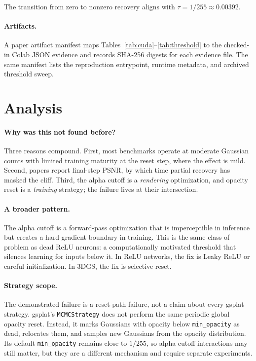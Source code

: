 \documentclass[runningheads]{llncs}
\begin{document}
The transition from zero to nonzero recovery aligns with $\tau = 1/255 \approx 0.00392$.

\paragraph{Artifacts.} A paper artifact manifest maps
Tables~\ref{tab:cuda}--\ref{tab:threshold} to the checked-in Colab JSON
evidence and records SHA-256 digests for each evidence file. The same manifest
lists the reproduction entrypoint, runtime metadata, and archived threshold
sweep.

\section{Analysis}

\paragraph{Why was this not found before?} Three reasons compound. First, most benchmarks operate at moderate Gaussian counts with limited training maturity at the reset step, where the effect is mild. Second, papers report final-step PSNR, by which time partial recovery has masked the cliff. Third, the alpha cutoff is a \emph{rendering} optimization, and opacity reset is a \emph{training} strategy; the failure lives at their intersection.

\paragraph{A broader pattern.} The alpha cutoff is a forward-pass optimization that is imperceptible in inference but creates a hard gradient boundary in training. This is the same class of problem as dead ReLU neurons: a computationally motivated threshold that silences learning for inputs below it. In ReLU networks, the fix is Leaky ReLU or careful initialization. In 3DGS, the fix is selective reset.

\paragraph{Strategy scope.} The demonstrated failure is a reset-path failure, not a claim about every gsplat strategy. gsplat's \texttt{MCMCStrategy} does not perform the same periodic global opacity reset. Instead, it marks Gaussians with opacity below \texttt{min\_opacity} as dead, relocates them, and samples new Gaussians from the opacity distribution. Its default \texttt{min\_opacity} remains close to $1/255$, so alpha-cutoff interactions may still matter, but they are a different mechanism and require separate experiments.
\end{document}
